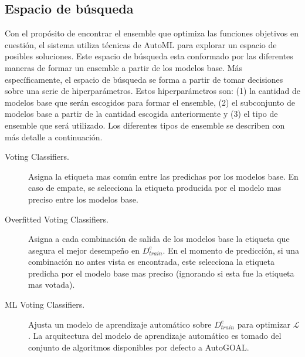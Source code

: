 \subsection{Espacio de búsqueda}

Con el propósito de encontrar el ensemble que optimiza las funciones objetivos en cuestión, el sistema utiliza técnicas de AutoML para explorar un espacio de posibles soluciones.
Este espacio de búsqueda esta conformado por las diferentes maneras de formar un ensemble a partir de los modelos base.
Más específicamente, el espacio de búsqueda se forma a partir de tomar decisiones sobre una serie de hiperparámetros.
Estos hiperparámetros son: (1) la cantidad de modelos base que serán escogidos para formar el ensemble, (2) el subconjunto de modelos base a partir de la cantidad escogida anteriormente y (3) el tipo de ensemble que será utilizado.
Los diferentes tipos de ensemble se describen con más detalle a continuación.

\begin{description}

    \item[Voting Classifiers.]
    Asigna la etiqueta mas común entre las predichas por los modelos base.
    En caso de empate, se selecciona la etiqueta producida por el modelo mas preciso entre los modelos base.
    
    \item[Overfitted Voting Classifiers.]
    Asigna a cada combinación de salida de los modelos base la etiqueta que asegura el mejor desempeño en $D_{train}^e$.
    En el momento de predicción, si una combinación no antes vista es encontrada, este selecciona la etiqueta predicha por el modelo base mas preciso (ignorando si esta fue la etiqueta mas votada).
    
    \item[ML Voting Classifiers.]
    Ajusta un modelo de aprendizaje automático sobre $D_{train}^e$ para optimizar $\mathcal{L}$.
    La arquitectura del modelo de aprendizaje automático es tomado del conjunto de algoritmos disponibles por defecto a AutoGOAL.
    
\end{description}


